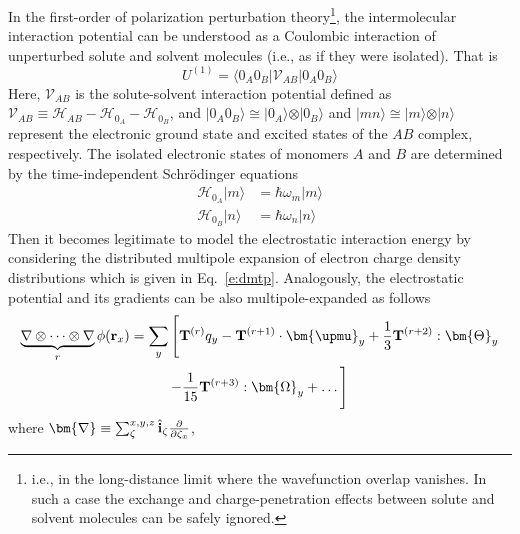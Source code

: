 \documentclass[b5paper,oneside,fleqn,11pt]{book}
\newcommand{\BM}[1]{\bm{#1}}
\begin{document}
\begin{refsection}
In the first\hyp{}order of polarization perturbation
theory\footnote{i.e., in the long\hyp{}distance limit 
where the wavefunction overlap vanishes. In such a case the
exchange and charge\hyp{}penetration effects 
between solute and solvent molecules can be safely ignored.}, 
the intermolecular interaction potential
can be understood as a Coulombic interaction
of unperturbed solute and solvent molecules (i.e., 
as if they were isolated). \citep{Jeziorski.Moszynski.Szalewicz.ChemRev.1994,
Stone.TheTheoryOfIntermolecularForces.1996}
That is
%
\begin{equation} \label{e:eint-1}
U^{(1)} = 
\langle 0_A0_B \lvert \mathscr{V}_{AB} \rvert 0_A0_B \rangle 
\end{equation}
%
Here, $\mathscr{V}_{AB}$ is the solute\hyp{}solvent
interaction potential defined as $\mathscr{V}_{AB}\equiv\mathscr{H}_{AB} - \mathscr{H}_{0_A} - \mathscr{H}_{0_B} $,
and $\vert 0_A0_B \rangle \cong \vert 0_A \rangle \otimes \vert 0_B \rangle$
and $\vert mn \rangle \cong \vert m \rangle \otimes \vert n \rangle$
represent the electronic ground state and excited states
of the $AB$ complex, respectively. The isolated electronic states of monomers $A$
and $B$ are determined by the time\hyp{}independent Schr{\"o}dinger
equations
%
\begin{subequations}
 \begin{align}
  \mathscr{H}_{0_A} \vert m \rangle &= \hbar \omega_m \vert m \rangle \\
  \mathscr{H}_{0_B} \vert n \rangle &= \hbar \omega_n \vert n \rangle
 \end{align}
\end{subequations}
%
Then it becomes legitimate to model the electrostatic interaction
energy by considering the distributed multipole expansion of electron
charge density distributions \citep{Stone.TheTheoryOfIntermolecularForces.1996}
which is given in Eq.~\eqref{e:dmtp}. Analogously,
the electrostatic potential and its gradients
can be also multipole\hyp{}expanded as follows
%
\begin{multline} \label{e:potential-gradients}
\underbrace{\nabla \otimes \cdots \otimes \nabla}_{r} \phi({\bf r}_x) = 
\sum_y \Bigg[ 
{\bf T}^{(r)} q_y - {\bf T}^{(r+1)} \cdot {\BM \upmu}_y + 
 \frac{1}{3} {\bf T}^{(r+2)} : {\BM \Theta}_y 
\\ - 
\frac{1}{15} {\bf T}^{(r+3)} : {\BM \Omega}_y + \ldots
\Bigg]
\end{multline}
%
where 
${\BM \nabla} \equiv \sum_{\zeta}^{x,y,z} \hat{\bf i}_\zeta \frac{\partial}{\partial \zeta_x}$, 

\end{refsection}
\end{document}
